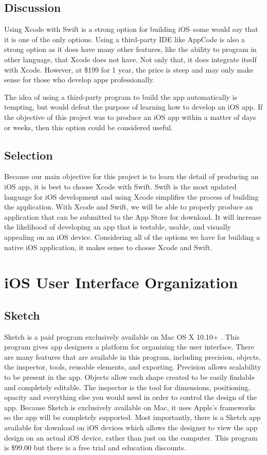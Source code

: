 \documentclass[letterpaper,10pt,draftclsnofoot,onecolumn,titlepage]{IEEEtran}
\begin{document}
	\subsection{Discussion}
	Using Xcode with Swift is a strong option for building iOS--some would say that it is one of the only options.
	Using a third-party IDE like AppCode is also a strong option as it does have many other features, like the ability to program in other language, that Xcode does not have. Not only that, it does integrate itself with Xcode. However, at \$199 for 1 year, the price is steep and may only make sense for those who develop apps professionally.

	The idea of using a third-party program to build the app automatically is tempting, but would defeat the purpose of learning how to develop an iOS app.
	If the objective of this project was to produce an iOS app within a matter of days or weeks, then this option could be considered useful.

	\subsection{Selection}
	Because our main objective for this project is to learn the detail of producing an iOS app, it is best to choose Xcode with Swift.
	Swift is the most updated language for iOS development and using Xcode simplifies the process of building the application.
	With Xcode and Swift, we will be able to properly produce an application that can be submitted to the App Store for download.
	It will increase the likelihood of developing an app that is testable, usable, and visually appealing on an iOS device.
	Considering all of the options we have for building a native iOS application, it makes sense to choose Xcode and Swift.

	\section{iOS User Interface Organization}
	\subsection{Sketch}
	Sketch is a paid program exclusively available on Mac OS X 10.10+ \cite{Sketch}.
	This program gives app designers a platform for organizing the user interface.
	There are many features that are available in this program, including precision, objects, the inspector, tools, reusable elements, and exporting.
	Precision allows scalability to be present in the app.
	Objects allow each shape created to be easily findable and completely editable.
	The inspector is the tool for dimensions, positioning, opacity and everything else you would need in order to control the design of the app.
	Because Sketch is exclusively available on Mac, it uses Apple's frameworks so the app will be completely supported.
	Most importantly, there is a Sketch app available for download on iOS devices which allows the designer to view the app design on an actual iOS device, rather than just on the computer.
	This program is \$99.00 but there is a free trial and education discounts.
\end{document}
